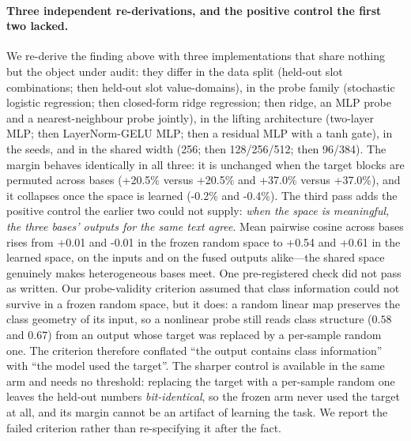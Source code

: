 \documentclass[10pt,twoside]{article}
\theoremstyle{definition}
\theoremstyle{plain}
\theoremstyle{remark}
\begin{document}
\paragraph{Three independent re-derivations, and the positive control the first two lacked.} We re-derive the finding above with three implementations that share nothing but the object under audit: they differ in the data split (held-out slot combinations; then held-out slot value-domains), in the probe family (stochastic logistic regression; then closed-form ridge regression; then ridge, an MLP probe and a nearest-neighbour probe jointly), in the lifting architecture (two-layer MLP; then LayerNorm-GELU MLP; then a residual MLP with a tanh gate), in the seeds, and in the shared width (256; then 128/256/512; then 96/384). The margin behaves identically in all three: it is unchanged when the target blocks are permuted across bases (+20.5\% versus +20.5\% and +37.0\% versus +37.0\%), and it collapses once the space is learned (-0.2\% and -0.4\%). The third pass adds the positive control the earlier two could not supply: \emph{when the space is meaningful, the three bases' outputs for the same text agree}. Mean pairwise cosine across bases rises from +0.01 and -0.01 in the frozen random space to +0.54 and +0.61 in the learned space, on the inputs and on the fused outputs alike---the shared space genuinely makes heterogeneous bases meet. One pre-registered check did not pass as written. Our probe-validity criterion assumed that class information could not survive in a frozen random space, but it does: a random linear map preserves the class geometry of its input, so a nonlinear probe still reads class structure ($0.58$ and $0.67$) from an output whose target was replaced by a per-sample random one. The criterion therefore conflated ``the output contains class information'' with ``the model used the target''. The sharper control is available in the same arm and needs no threshold: replacing the target with a per-sample random one leaves the held-out numbers \emph{bit-identical}, so the frozen arm never used the target at all, and its margin cannot be an artifact of learning the task. We report the failed criterion rather than re-specifying it after the fact.
\end{document}

